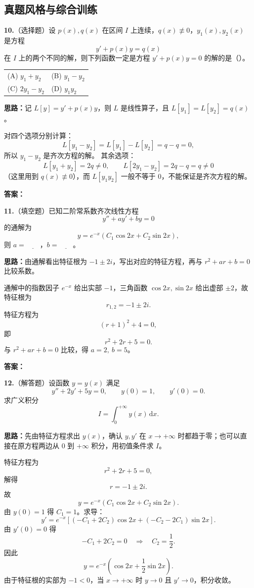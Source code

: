 \subsection{真题风格与综合训练}

\textbf{10.}（选择题）设 $p(x),q(x)$ 在区间 $I$ 上连续，$q(x)\not\equiv0$，$y_1(x),y_2(x)$ 是方程
\[
y'+p(x)y=q(x)
\]
在 $I$ 上的两个不同的解，则下列函数一定是方程 $y'+p(x)y=0$ 的解的是（\quad）。

\begin{center}
\begin{tabular}{ll}
(A) $y_1+y_2$ & (B) $y_1-y_2$ \\[4pt]
(C) $2y_1-y_2$ & (D) $y_1y_2$
\end{tabular}
\end{center}

\ifshowsolutions%
\textbf{思路：}记 $L[y]=y'+p(x)y$，则 $L$ 是线性算子，且 $L[y_1]=L[y_2]=q(x)$。

对四个选项分别计算：
\[
L[y_1-y_2]=L[y_1]-L[y_2]=q-q=0,
\]
所以 $y_1-y_2$ 是齐次方程的解。
其余选项：
\[
L[y_1+y_2]=2q\neq 0,\qquad
L[2y_1-y_2]=2q-q=q\neq 0
\]
（这里用到 $q(x)\not\equiv0$），而 $L[y_1y_2]$ 一般不等于 $0$，不能保证是齐次方程的解。

\textbf{答案：}

\else \answerarea[4] \fi%
\textbf{11.}（填空题）已知二阶常系数齐次线性方程
\[
y''+ay'+by=0
\]
的通解为
\[
y=e^{-x}\left(C_1\cos 2x+C_2\sin 2x\right),
\]
则 $a=\underline{\qquad}$，$b=\underline{\qquad}$。

\ifshowsolutions%
\textbf{思路：}由通解看出特征根为 $-1\pm 2i$，写出对应的特征方程，再与 $r^2+ar+b=0$ 比较系数。

通解中的指数因子 $e^{-x}$ 给出实部 $-1$，三角函数 $\cos 2x,\sin 2x$ 给出虚部 $\pm2$，故特征根为
\[
r_{1,2}=-1\pm 2i.
\]
特征方程为
\[
(r+1)^2+4=0,
\]
即
\[
r^2+2r+5=0.
\]
与 $r^2+ar+b=0$ 比较，得 $a=2,\ b=5$。

\textbf{答案：}

\else \answerarea[4] \fi%
\textbf{12.}（解答题）设函数 $y=y(x)$ 满足
\[
y''+2y'+5y=0,\qquad y(0)=1,\qquad y'(0)=0.
\]
求广义积分
\[
I=\int_0^{+\infty}y(x)\,\mathrm{d}x.
\]

\ifshowsolutions%
\textbf{思路：}先由特征方程求出 $y(x)$，确认 $y,y'$ 在 $x\to+\infty$ 时都趋于零；也可以直接在原方程两边从 $0$ 到 $+\infty$ 积分，用初值条件求 $I$。

特征方程为
\[
r^2+2r+5=0,
\]
解得
\[
r=-1\pm 2i.
\]
故
\[
y=e^{-x}\left(C_1\cos 2x+C_2\sin 2x\right).
\]
由 $y(0)=1$ 得 $C_1=1$。求导：
\[
y'=e^{-x}\left[(-C_1+2C_2)\cos 2x+(-C_2-2C_1)\sin 2x\right].
\]
由 $y'(0)=0$ 得
\[
-C_1+2C_2=0
\quad\Longrightarrow\quad
C_2=\frac12.
\]
因此
\[
y=e^{-x}\left(\cos 2x+\frac12\sin 2x\right).
\]
由于特征根的实部为 $-1<0$，当 $x\to+\infty$ 时 $y\to0$ 且 $y'\to0$，积分收敛。

